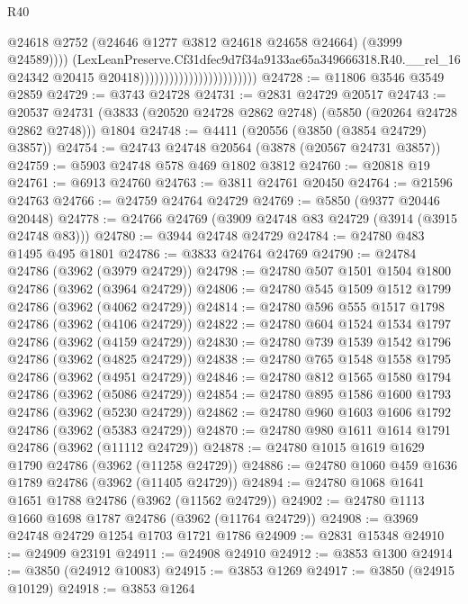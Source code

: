 \begin{lexlean}{R40}
\begin{coremodule}
                                                        @24618
                                                        @2752
                                                        (@24646 @1277 @3812 @24618 @24658 @24664)
                                                        (@3999 @24589))))
                                                  (LexLeanPreserve.Cf31dfec9d7f34a9133ae65a349666318.R40.__rel_16
                                                    @24342
                                                    @20415
                                                    @20418))))))))))))))))))))))))
@24728 := @11806 @3546 @3549 @2859
@24729 := @3743 @24728
@24731 := @2831 @24729 @20517
@24743 := @20537
    @24731
    (@3833 (@20520 @24728 @2862 @2748) (@5850 (@20264 @24728 @2862 @2748)))
    @1804
@24748 := @4411 (@20556 (@3850 (@3854 @24729) @3857))
@24754 := @24743 @24748 @20564 (@3878 (@20567 @24731 @3857))
@24759 := @5903 @24748 @578 @469 @1802 @3812
@24760 := @20818 @19
@24761 := @6913 @24760
@24763 := @3811 @24761 @20450
@24764 := @21596 @24763
@24766 := @24759 @24764 @24729
@24769 := @5850 (@9377 @20446 @20448)
@24778 := @24766 @24769 (@3909 @24748 @83 @24729 (@3914 (@3915 @24748 @83)))
@24780 := @3944 @24748 @24729
@24784 := @24780 @483 @1495 @495 @1801
@24786 := @3833 @24764 @24769
@24790 := @24784 @24786 (@3962 (@3979 @24729))
@24798 := @24780 @507 @1501 @1504 @1800 @24786 (@3962 (@3964 @24729))
@24806 := @24780 @545 @1509 @1512 @1799 @24786 (@3962 (@4062 @24729))
@24814 := @24780 @596 @555 @1517 @1798 @24786 (@3962 (@4106 @24729))
@24822 := @24780 @604 @1524 @1534 @1797 @24786 (@3962 (@4159 @24729))
@24830 := @24780 @739 @1539 @1542 @1796 @24786 (@3962 (@4825 @24729))
@24838 := @24780 @765 @1548 @1558 @1795 @24786 (@3962 (@4951 @24729))
@24846 := @24780 @812 @1565 @1580 @1794 @24786 (@3962 (@5086 @24729))
@24854 := @24780 @895 @1586 @1600 @1793 @24786 (@3962 (@5230 @24729))
@24862 := @24780 @960 @1603 @1606 @1792 @24786 (@3962 (@5383 @24729))
@24870 := @24780 @980 @1611 @1614 @1791 @24786 (@3962 (@11112 @24729))
@24878 := @24780 @1015 @1619 @1629 @1790 @24786 (@3962 (@11258 @24729))
@24886 := @24780 @1060 @459 @1636 @1789 @24786 (@3962 (@11405 @24729))
@24894 := @24780 @1068 @1641 @1651 @1788 @24786 (@3962 (@11562 @24729))
@24902 := @24780 @1113 @1660 @1698 @1787 @24786 (@3962 (@11764 @24729))
@24908 := @3969 @24748 @24729 @1254 @1703 @1721 @1786
@24909 := @2831 @15348
@24910 := @24909 @23191
@24911 := @24908 @24910
@24912 := @3853 @1300
@24914 := @3850 (@24912 @10083)
@24915 := @3853 @1269
@24917 := @3850 (@24915 @10129)
@24918 := @3853 @1264

\end{coremodule}
\end{lexlean}
